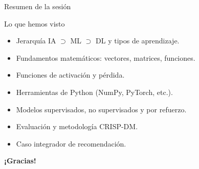\documentclass[aspectratio=169, 10pt, xcolor=table]{beamer}
\begin{document}
\begin{frame}{Resumen de la sesión}
    \begin{exampleblock}{Lo que hemos visto}
        \begin{itemize}
            \item Jerarquía IA $\supset$ ML $\supset$ DL y tipos de aprendizaje.
            \item Fundamentos matemáticos: vectores, matrices, funciones.
            \item Funciones de activación y pérdida.
            \item Herramientas de Python (NumPy, PyTorch, etc.).
            \item Modelos supervisados, no supervisados y por refuerzo.
            \item Evaluación y metodología CRISP-DM.
            \item Caso integrador de recomendación.
        \end{itemize}
    \end{exampleblock}
    \vspace{0.3cm}

\end{frame}

\begin{frame}
    \centering
    \Huge \textbf{¡Gracias!}
    \vspace{1cm}

\end{frame}
\end{document}
